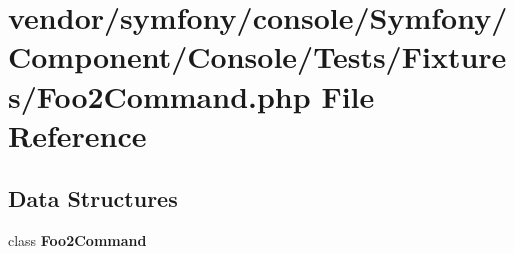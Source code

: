\section{vendor/symfony/console/\+Symfony/\+Component/\+Console/\+Tests/\+Fixtures/\+Foo2\+Command.php File Reference}
\label{_foo2_command_8php}
\subsection*{Data Structures}
\begin{DoxyCompactItemize}
\item 
class {\bf Foo2\+Command}
\end{DoxyCompactItemize}
